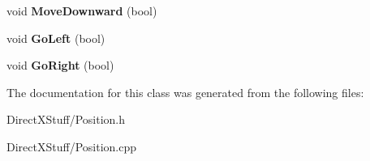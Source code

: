 \begin{DoxyCompactItemize}
\item 
\hypertarget{class_position_ab62082b0403fec276dce8e888688d836}{void {\bfseries Move\-Downward} (bool)}\label{class_position_ab62082b0403fec276dce8e888688d836}

\item 
\hypertarget{class_position_a309bcdeac18054825c94fb97b6f4100d}{void {\bfseries Go\-Left} (bool)}\label{class_position_a309bcdeac18054825c94fb97b6f4100d}

\item 
\hypertarget{class_position_a8701369e0cd737965fff0aa3209fbc21}{void {\bfseries Go\-Right} (bool)}\label{class_position_a8701369e0cd737965fff0aa3209fbc21}

\end{DoxyCompactItemize}


The documentation for this class was generated from the following files\-:\begin{DoxyCompactItemize}
\item 
Direct\-X\-Stuff/Position.\-h\item 
Direct\-X\-Stuff/Position.\-cpp\end{DoxyCompactItemize}
